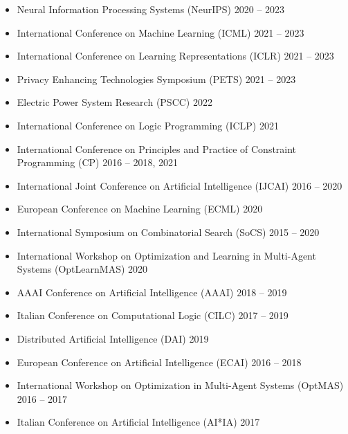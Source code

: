\begin{itemize}
  \item Neural Information Processing Systems (NeurIPS) 
  \hfill {2020 -- 2023}

  \item International Conference on Machine Learning (ICML) 
  \hfill{2021 -- 2023} 

  \item International Conference on Learning Representations (ICLR)
  \hfill{2021 -- 2023}

  \item Privacy Enhancing Technologies Symposium (PETS) 
  \hfill {2021 -- 2023}

  \item Electric Power System Research (PSCC)
  \hfill{2022}

  \item International Conference on Logic Programming (ICLP) 
  \hfill {2021}

  \item International Conference on Principles and Practice of Constraint Programming (CP) 
  \hfill{2016 -- 2018, 2021} 

  \item International Joint Conference on Artificial Intelligence (IJCAI) 
  \hfill {2016 -- 2020}

  \item European Conference on Machine Learning (ECML) 
  \hfill {2020}

  \item International Symposium on Combinatorial Search (SoCS) 
  \hfill {2015 -- 2020}

  \item International Workshop on Optimization and Learning in 
        Multi-Agent Systems (OptLearnMAS) 
  \hfill {2020}

  \item AAAI Conference on Artificial Intelligence (AAAI) 
  \hfill {2018 -- 2019}

  \item Italian Conference on Computational Logic (CILC) 
  \hfill {2017 -- 2019}

  \item Distributed Artificial Intelligence (DAI) 
  \hfill {2019}

  \item European Conference on Artificial Intelligence (ECAI) 
  \hfill {2016 -- 2018}

  \item International Workshop on Optimization in Multi-Agent Systems (OptMAS) 
  \hfill {2016 -- 2017}

  \item Italian Conference on Artificial Intelligence (AI*IA) 
  \hfill {2017}
\end{itemize}


